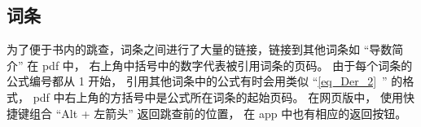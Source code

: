 \subsection{词条}

为了便于书内的跳查，词条之间进行了大量的链接，链接到其他词条如 “导数简介” 在 pdf 中， 右上角中括号中的数字代表被引用词条的页码。 由于每个词条的公式编号都从 1 开始， 引用其他词条中的公式有时会用类似 “\autoref{eq_Der_2}~” 的格式， pdf 中右上角的方括号中是公式所在词条的起始页码。 在网页版中， 使用快捷键组合 “Alt + 左箭头” 返回跳查前的位置， 在 app 中也有相应的返回按钮。

